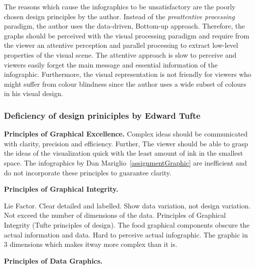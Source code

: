 \documentclass[a4paper, 11pt]{scrartcl}
\begin{document}
The reasons which cause the infographics to be unsatisfactory are the poorly
chosen design principles by the author. Instead of the \textit{preattentive
processing} paradigm, the author uses the data-driven, Bottom-up approach.
Therefore, the graphs should be perceived with the visual processing paradigm
and require from the viewer an attentive perception and parallel processing to
extract low-level properties of the visual scene. The attentive approach is slow
to perceive and viewers easily forget the main message and essential information
of the infographic. Furthermore, the visual representation is not friendly for
viewers who might suffer from colour blindness since the author uses a wide
subset of colours in his visual design.

\subsubsection{Deficiency of design priniciples by Edward Tufte}

\textbf{Principles of Graphical Excellence.} Complex ideas should be
communicated with clarity, precision and efficiency. Further, The viewer should
be able to grasp the ideas of the visualization quick with the least amount of
ink in the smallest space. The infographics by Dan
Mariglio~\ref{assignmentGraphic} are inefficient and do not incorporate these
principles to guarantee clarity.

\textbf{Principles of Graphical Integrity.}

Lie Factor. Clear detailed and labelled. Show data variation, not design
variation. Not exceed the number of dimensions of the data. Principles of
Graphical Integrity (Tufte principles of design). The food graphical components
obscure the actual information and data. Hard to perceive actual infographic.
The graphic in 3 dimensions which makes itway more complex than it is.

\textbf{Principles of Data Graphics.}

\end{document}
